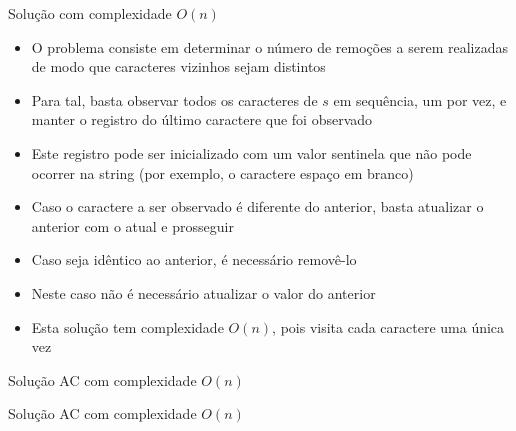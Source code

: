 \begin{frame}[fragile]{Solução com complexidade $O(n)$}

    \begin{itemize}
        \item O problema consiste em determinar o número de remoções a serem realizadas de modo
            que caracteres vizinhos sejam distintos

        \item Para tal, basta observar todos os caracteres de $s$ em sequência, um por vez,
            e manter o registro do último 
            caractere que foi observado

        \item Este registro pode ser inicializado com um valor sentinela que não pode ocorrer
            na string (por exemplo, o caractere espaço em branco)

        \item Caso o caractere a ser observado é diferente do anterior, basta atualizar o
            anterior com o atual e prosseguir

        \item Caso seja idêntico ao anterior, é necessário removê-lo

        \item Neste caso não é necessário atualizar o valor do anterior

        \item Esta solução tem complexidade $O(n)$, pois visita cada caractere uma única vez

   \end{itemize}

\end{frame}

\begin{frame}[fragile]{Solução AC com complexidade $O(n)$}
\end{frame}

\begin{frame}[fragile]{Solução AC com complexidade $O(n)$}
\end{frame}
